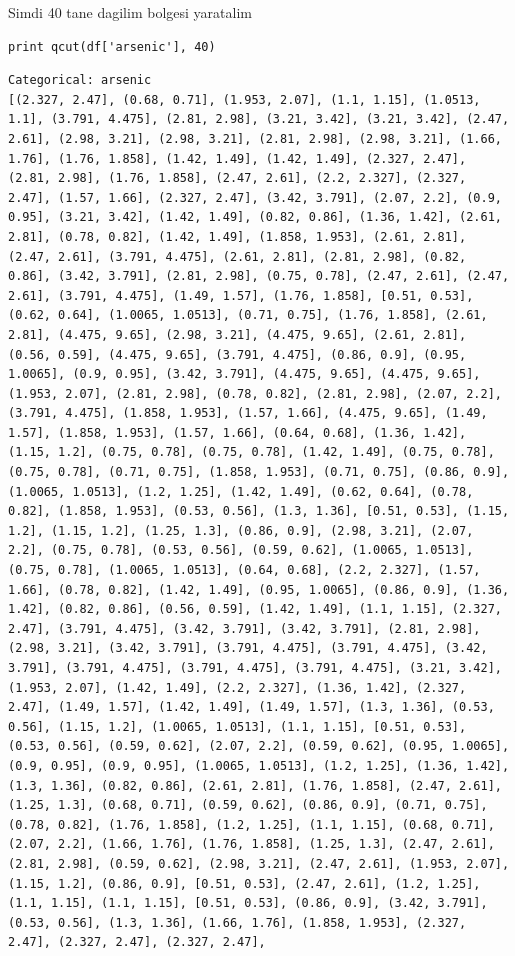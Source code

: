 \documentclass[12pt,fleqn]{article}\usepackage{../common}
\begin{document}
Simdi 40 tane dagilim bolgesi yaratalim

\begin{verbatim}
print qcut(df['arsenic'], 40)
\end{verbatim}

\begin{verbatim}
Categorical: arsenic
[(2.327, 2.47], (0.68, 0.71], (1.953, 2.07], (1.1, 1.15], (1.0513, 1.1], (3.791, 4.475], (2.81, 2.98], (3.21, 3.42], (3.21, 3.42], (2.47, 2.61], (2.98, 3.21], (2.98, 3.21], (2.81, 2.98], (2.98, 3.21], (1.66, 1.76], (1.76, 1.858], (1.42, 1.49], (1.42, 1.49], (2.327, 2.47], (2.81, 2.98], (1.76, 1.858], (2.47, 2.61], (2.2, 2.327], (2.327, 2.47], (1.57, 1.66], (2.327, 2.47], (3.42, 3.791], (2.07, 2.2], (0.9, 0.95], (3.21, 3.42], (1.42, 1.49], (0.82, 0.86], (1.36, 1.42], (2.61, 2.81], (0.78, 0.82], (1.42, 1.49], (1.858, 1.953], (2.61, 2.81], (2.47, 2.61], (3.791, 4.475], (2.61, 2.81], (2.81, 2.98], (0.82, 0.86], (3.42, 3.791], (2.81, 2.98], (0.75, 0.78], (2.47, 2.61], (2.47, 2.61], (3.791, 4.475], (1.49, 1.57], (1.76, 1.858], [0.51, 0.53], (0.62, 0.64], (1.0065, 1.0513], (0.71, 0.75], (1.76, 1.858], (2.61, 2.81], (4.475, 9.65], (2.98, 3.21], (4.475, 9.65], (2.61, 2.81], (0.56, 0.59], (4.475, 9.65], (3.791, 4.475], (0.86, 0.9], (0.95, 1.0065], (0.9, 0.95], (3.42, 3.791], (4.475, 9.65], (4.475, 9.65], (1.953, 2.07], (2.81, 2.98], (0.78, 0.82], (2.81, 2.98], (2.07, 2.2], (3.791, 4.475], (1.858, 1.953], (1.57, 1.66], (4.475, 9.65], (1.49, 1.57], (1.858, 1.953], (1.57, 1.66], (0.64, 0.68], (1.36, 1.42], (1.15, 1.2], (0.75, 0.78], (0.75, 0.78], (1.42, 1.49], (0.75, 0.78], (0.75, 0.78], (0.71, 0.75], (1.858, 1.953], (0.71, 0.75], (0.86, 0.9], (1.0065, 1.0513], (1.2, 1.25], (1.42, 1.49], (0.62, 0.64], (0.78, 0.82], (1.858, 1.953], (0.53, 0.56], (1.3, 1.36], [0.51, 0.53], (1.15, 1.2], (1.15, 1.2], (1.25, 1.3], (0.86, 0.9], (2.98, 3.21], (2.07, 2.2], (0.75, 0.78], (0.53, 0.56], (0.59, 0.62], (1.0065, 1.0513], (0.75, 0.78], (1.0065, 1.0513], (0.64, 0.68], (2.2, 2.327], (1.57, 1.66], (0.78, 0.82], (1.42, 1.49], (0.95, 1.0065], (0.86, 0.9], (1.36, 1.42], (0.82, 0.86], (0.56, 0.59], (1.42, 1.49], (1.1, 1.15], (2.327, 2.47], (3.791, 4.475], (3.42, 3.791], (3.42, 3.791], (2.81, 2.98], (2.98, 3.21], (3.42, 3.791], (3.791, 4.475], (3.791, 4.475], (3.42, 3.791], (3.791, 4.475], (3.791, 4.475], (3.791, 4.475], (3.21, 3.42], (1.953, 2.07], (1.42, 1.49], (2.2, 2.327], (1.36, 1.42], (2.327, 2.47], (1.49, 1.57], (1.42, 1.49], (1.49, 1.57], (1.3, 1.36], (0.53, 0.56], (1.15, 1.2], (1.0065, 1.0513], (1.1, 1.15], [0.51, 0.53], (0.53, 0.56], (0.59, 0.62], (2.07, 2.2], (0.59, 0.62], (0.95, 1.0065], (0.9, 0.95], (0.9, 0.95], (1.0065, 1.0513], (1.2, 1.25], (1.36, 1.42], (1.3, 1.36], (0.82, 0.86], (2.61, 2.81], (1.76, 1.858], (2.47, 2.61], (1.25, 1.3], (0.68, 0.71], (0.59, 0.62], (0.86, 0.9], (0.71, 0.75], (0.78, 0.82], (1.76, 1.858], (1.2, 1.25], (1.1, 1.15], (0.68, 0.71], (2.07, 2.2], (1.66, 1.76], (1.76, 1.858], (1.25, 1.3], (2.47, 2.61], (2.81, 2.98], (0.59, 0.62], (2.98, 3.21], (2.47, 2.61], (1.953, 2.07], (1.15, 1.2], (0.86, 0.9], [0.51, 0.53], (2.47, 2.61], (1.2, 1.25], (1.1, 1.15], (1.1, 1.15], [0.51, 0.53], (0.86, 0.9], (3.42, 3.791], (0.53, 0.56], (1.3, 1.36], (1.66, 1.76], (1.858, 1.953], (2.327, 2.47], (2.327, 2.47], (2.327, 2.47], 
\end{verbatim}
\end{document}
